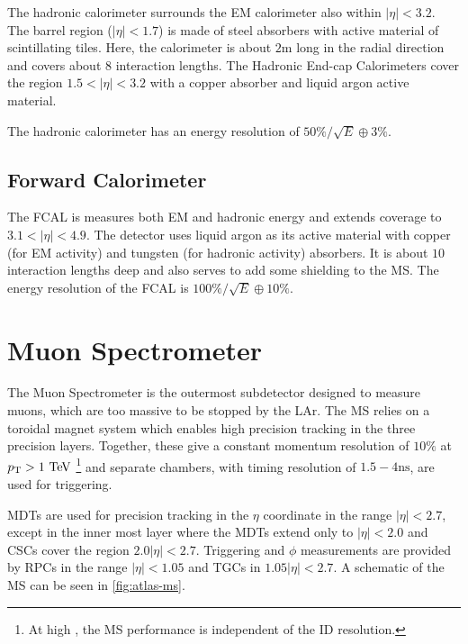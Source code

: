 The hadronic calorimeter surrounds the \ac{EM} calorimeter also within $|\eta| < 3.2$. The barrel region ($|\eta| < 1.7$) is made of steel absorbers with active material of scintillating tiles. Here, the calorimeter is about $2$m long in the radial direction and covers about $8$ interaction lengths. The Hadronic End-cap Calorimeters cover the region $1.5 < |\eta| < 3.2$ with a copper absorber and liquid argon active material.


The hadronic calorimeter has an energy resolution of  $50\%/\sqrt{E} \oplus 3\%$. 

\subsection{Forward Calorimeter}
The \ac{FCAL} is measures  both \ac{EM} and hadronic energy and extends coverage to $3.1 < |\eta| < 4.9$. The detector uses liquid argon as its active material with copper (for \ac{EM} activity) and tungsten (for hadronic activity) absorbers. It is about $10$ interaction lengths deep and also serves to add some shielding to the \ac{MS}. The energy resolution of the \ac{FCAL} is $100\%/\sqrt{E} \oplus 10\%$.




\section{Muon Spectrometer}
The Muon Spectrometer is the outermost subdetector designed to measure muons, which are too massive to be stopped by the \ac{LAr}. The \ac{MS} relies on a toroidal magnet system which enables high precision tracking in the three precision layers. Together, these give a constant momentum resolution of $10\%$ at $\pT > 1 \TeV$ \footnote{At high \pt, the \ac{MS} performance is independent of the \ac{ID} resolution.} and separate chambers, with timing resolution of $1.5-4 \textrm{ns}$, are used for triggering.  

\ac{MDT}s are used for precision tracking in the $\eta$ coordinate in the range $|\eta| < 2.7$, except in the inner most layer where the \ac{MDT}s extend only to $|\eta| < 2.0$ and \ac{CSC}s cover the region $2.0|\eta| < 2.7$. Triggering and $\phi$ measurements are provided by \ac{RPC}s in the range $|\eta| < 1.05$ and \ac{TGC}s in $1.05 |\eta| < 2.7$. A schematic of the \ac{MS} can be seen in \autoref{fig:atlas-ms}.  




